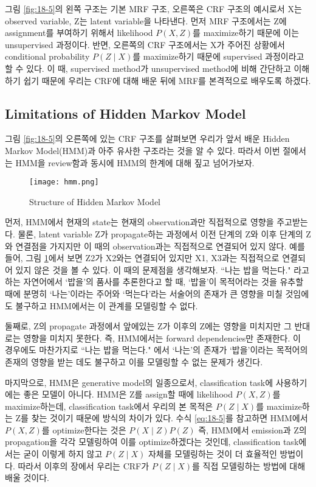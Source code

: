 \documentclass[draft=false]{oblivoir}
\begin{document}
그림 \ref{fig:18-5}의 왼쪽 구조는 기본 MRF 구조, 오른쪽은 CRF 구조의 예시로서  X는 observed variable, Z는 latent variable을 나타낸다. 먼저 MRF 구조에서는 Z에 assignment를 부여하기 위해서 likelihood $P(X,Z)$를 maximize하기 때문에 이는 unsupervised 과정이다. 반면, 오른쪽의 CRF 구조에서는 X가 주어진 상황에서 conditional probability $P(Z\mid X)$를 maximize하기 때문에 supervised 과정이라고 할 수 있다. 이 때, supervised method가 unsupervised method에 비해 간단하고 이해하기 쉽기 때문에 우리는 CRF에 대해 배운 뒤에 MRF를 본격적으로 배우도록 하겠다. 

\subsection{Limitations of Hidden Markov Model}
그림 \ref{fig:18-5}의 오른쪽에 있는 CRF 구조를 살펴보면 우리가 앞서 배운 Hidden Markov Model(HMM)과 아주 유사한 구조라는 것을 알 수 있다. 따라서 이번 절에서는 HMM을 review함과 동시에 HMM의 한계에 대해 짚고 넘어가보자. 

\begin{figure}[ht] \centering 
  \texttt{[image: hmm.png]}
  \caption{Structure of Hidden Markov Model}
  \label{fig:18-6}
\end{figure}

먼저, HMM에서 현재의 state는 현재의 observation과만 직접적으로 영향을 주고받는다. 물론, latent variable Z가 propagate하는 과정에서 이전 단계의 Z와 이후 단계의 Z와 연결점을 가지지만 이 때의 observation과는 직접적으로 연결되어 있지 않다. 예를 들어, 그림 \ref{fig:18-6}에서 보면 Z2가 X2와는 연결되어 있지만 X1, X3과는 직접적으로 연결되어 있지 않은 것을 볼 수 있다. 이 때의 문제점을 생각해보자. ``나는 밥을 먹는다." 라고 하는 자연어에서 `밥을'의 품사를 추론한다고 할 때, `밥을'이 목적어라는 것을 유추할 때에 분명히 `나는'이라는 주어와 `먹는다'라는 서술어의 존재가 큰 영향을 미칠 것임에도 불구하고 HMM에서는 이 관계를 모델링할 수 없다.  

둘째로, Z의 propagate 과정에서 앞에있는 Z가 이후의 Z에는 영향을 미치지만 그 반대로는 영향을 미치지 못한다. 즉, HMM에서는 forward dependencies만 존재한다. 이 경우에도 마찬가지로 ``나는 밥을 먹는다." 에서 `나는'의 존재가 `밥을'이라는 목적어의 존재의 영향을 받는 데도 불구하고 이를 모델링할 수 없는 문제가 생긴다. 

마지막으로, HMM은 generative model의 일종으로서, classification task에 사용하기에는 좋은 모델이 아니다. HMM은 Z를 assign할 때에 likelihood $P(X,Z)$를 maximize하는데, classification task에서 우리의 본 목적은 $P(Z\mid X)$를 maximize하는 Z를 찾는 것이기 때문에 방식의 차이가 있다. 수식 \ref{eq:18-5}를 참고하면 HMM에서 $P(X,Z)$를 optimize한다는 것은 $P(X\mid Z)P(Z)$ 즉, HMM에서 emission과 Z의 propagation을 각각 모델링하여 이를 optimize하겠다는 것인데, classification task에서는 굳이 이렇게 하지 않고 $P(Z\mid X)$ 자체를 모델링하는 것이 더 효율적인 방법이다. 따라서 이후의 장에서 우리는 CRF가 $P(Z\mid X)$를 직접 모델링하는 방법에 대해 배울 것이다. 
\end{document}
